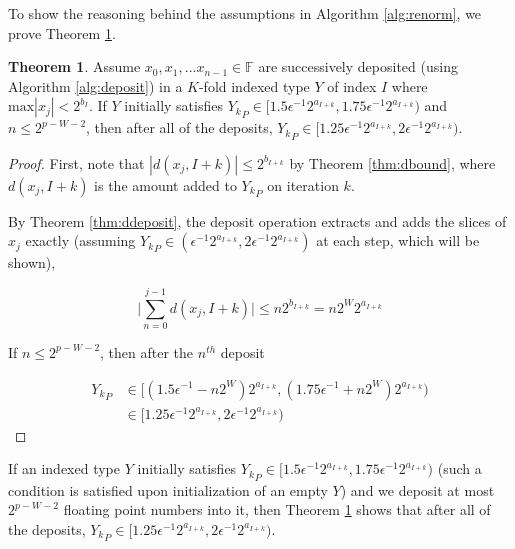 \documentclass[12pt]{article}
\providecommand{\F}{\ensuremath{\mathbb{F}}}
\providecommand{\max}{\ensuremath{\text{max}}}
\theoremstyle{definition}
\newtheorem{thm}{Theorem}[section]
\numberwithin{equation}{section}
\numberwithin{figure}{section}
\begin{document}
    To show the reasoning behind the assumptions in Algorithm \ref{alg:renorm}, we prove Theorem \ref{thm:renormfreq}.

      \begin{samepage}
    \begin{thm}
      Assume $x_0, x_1, ... x_{n - 1} \in \F$ are successively deposited (using Algorithm \ref{alg:deposit}) in a $K$-fold indexed type $Y$ of index $I$ where $\max|x_j| < 2^{b_I}$. If $Y$ initially satisfies ${Y_k}_P \in [1.5  \epsilon^{-1} 2^{a_{I + k}}, 1.75  \epsilon^{-1} 2^{a_{I + k}})$ and $n \leq 2^{p - W - 2}$, then after all of the deposits, ${Y_k}_P \in [1.25  \epsilon^{-1} 2^{a_{I + k}}, 2  \epsilon^{-1} 2^{a_{I + k}})$.
      \label{thm:renormfreq}
    \end{thm}
    \end{samepage}

    \begin{proof}
    First, note that $|d(x_j, I + k)| \leq 2^{b_{I + k}}$ by Theorem \ref{thm:dbound}, where $d(x_j, I + k)$ is the amount added to ${Y_k}_P$ on iteration $k$.

    By Theorem \ref{thm:ddeposit}, the deposit operation extracts and adds the slices of $x_j$ exactly (assuming ${Y_k}_P \in (\epsilon^{-1} 2^{a_{I + k}}, 2  \epsilon^{-1} 2^{a_{I + k}})$ at each step, which will be shown),

    \begin{equation*}
    \bigl|\sum \limits_{n = 0}^{j - 1} d(x_j, I + k)\bigr| \leq n  2^{b_{I + k}} = n  2^{W}  2^{a_{I + k}}
    \end{equation*}

    If $n \leq 2^{p - W - 2}$, then after the $n^{th}$ deposit

    \begin{align*}
    {Y_k}_P &\in \bigl[(1.5  \epsilon^{-1} - n  2^W) 2^{a_{I + k}}, (1.75  \epsilon^{-1} + n  2^W) 2^{a_{I + k}}\bigr) \\
    &\in [1.25  \epsilon^{-1} 2^{a_{I + k}}, 2  \epsilon^{-1} 2^{a_{I + k}})
    \end{align*}
    \end{proof}

    If an indexed type $Y$ initially satisfies ${Y_k}_P \in [1.5  \epsilon^{-1} 2^{a_{I + k}}, 1.75  \epsilon^{-1} 2^{a_{I + k}})$ (such a condition is satisfied upon initialization of an empty $Y$) and we deposit at most $2^{p - W - 2}$ floating point numbers into it, then Theorem \ref{thm:renormfreq} shows that after all of the deposits, ${Y_k}_P \in [1.25  \epsilon^{-1} 2^{a_{I + k}}, 2  \epsilon^{-1} 2^{a_{I + k}})$.
\end{document}
